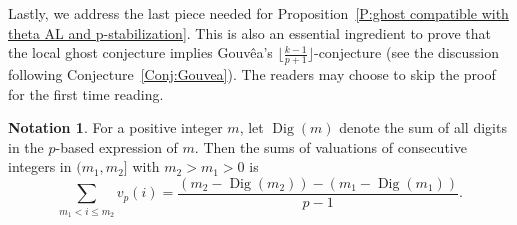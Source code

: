 \documentclass[12pt]{amsart}
\theoremstyle{definition}
\newtheorem{notation}[subsection]{Notation}
\numberwithin{equation}{subsection}
\DeclareMathOperator{\Dig}{Dig}
\begin{document}
Lastly, we address the last piece needed for Proposition~\ref{P:ghost compatible with theta AL and p-stabilization}. This is also an essential ingredient to prove that the local ghost conjecture implies Gouv\^ea's $\lfloor\frac{k-1}{p+1}\rfloor$-conjecture (see the discussion following Conjecture~\ref{Conj:Gouvea}). The readers may choose to skip  the proof for the first time reading.

\begin{notation}
For a positive integer $m$, let $\Dig(m)$ denote the sum of all digits in the $p$-based expression of $m$. Then the sums of valuations of consecutive integers in $(m_1, m_2]$ with $m_2 > m_1>0$ is
\begin{equation}
\label{E:sum of consecutive valuations}
\sum_{m_1< i \leq m_2} v_p(i) = \frac{(m_2-\Dig(m_2) )-(m_1 -\Dig(m_1))} {p-1}.
\end{equation}

\end{notation}
\end{document}
